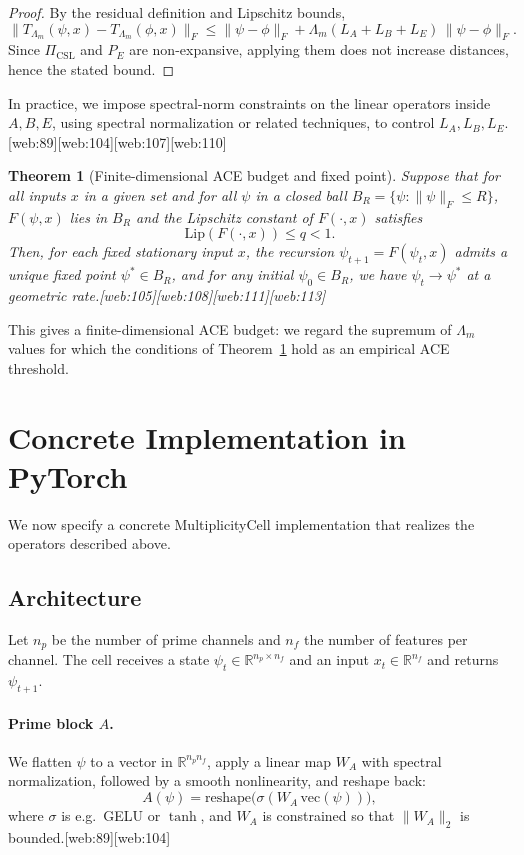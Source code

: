 \documentclass[11pt]{article}
\theoremstyle{definition}
\theoremstyle{plain}
\newtheorem{theorem}{Theorem}
\begin{document}
\begin{proof}
By the residual definition and Lipschitz bounds,
\[
  \|T_{\Lambda_m}(\psi,x) - T_{\Lambda_m}(\phi,x)\|_F 
  \le \|\psi - \phi\|_F + \Lambda_m(L_A+L_B+L_E)\,\|\psi - \phi\|_F.
\]
Since $\Pi_{\mathrm{CSL}}$ and $P_E$ are non-expansive, applying them does not increase distances, hence the stated bound.
\end{proof}

In practice, we impose spectral-norm constraints on the linear operators inside $A,B,E$, using spectral normalization or related techniques, to control $L_A,L_B,L_E$.[web:89][web:104][web:107][web:110]

\begin{theorem}[Finite-dimensional ACE budget and fixed point]\label{thm:banach}
Suppose that for all inputs $x$ in a given set and for all $\psi$ in a closed ball $B_R = \{\psi : \|\psi\|_F \le R\}$, $F(\psi,x)$ lies in $B_R$ and the Lipschitz constant of $F(\cdot,x)$ satisfies
\[
  \mathrm{Lip}(F(\cdot,x)) \le q < 1.
\]
Then, for each fixed stationary input $x$, the recursion $\psi_{t+1} = F(\psi_t,x)$ admits a unique fixed point $\psi^\ast \in B_R$, and for any initial $\psi_0 \in B_R$, we have $\psi_t \to \psi^\ast$ at a geometric rate.[web:105][web:108][web:111][web:113]
\end{theorem}

This gives a finite-dimensional ACE budget: we regard the supremum of $\Lambda_m$ values for which the conditions of Theorem~\ref{thm:banach} hold as an empirical ACE threshold.

\section{Concrete Implementation in PyTorch}\label{sec:impl}

We now specify a concrete MultiplicityCell implementation that realizes the operators described above.

\subsection{Architecture}

Let $n_p$ be the number of prime channels and $n_f$ the number of features per channel.
The cell receives a state $\psi_t \in \mathbb{R}^{n_p \times n_f}$ and an input $x_t \in \mathbb{R}^{n_f}$ and returns $\psi_{t+1}$.

\paragraph{Prime block $A$.}
We flatten $\psi$ to a vector in $\mathbb{R}^{n_p n_f}$, apply a linear map $W_A$ with spectral normalization, followed by a smooth nonlinearity, and reshape back:
\[
  A(\psi) = \mathrm{reshape}\bigl(\sigma(W_A\,\mathrm{vec}(\psi))\bigr),
\]
where $\sigma$ is e.g.\ GELU or $\tanh$, and $W_A$ is constrained so that $\|W_A\|_2$ is bounded.[web:89][web:104]
\end{document}
